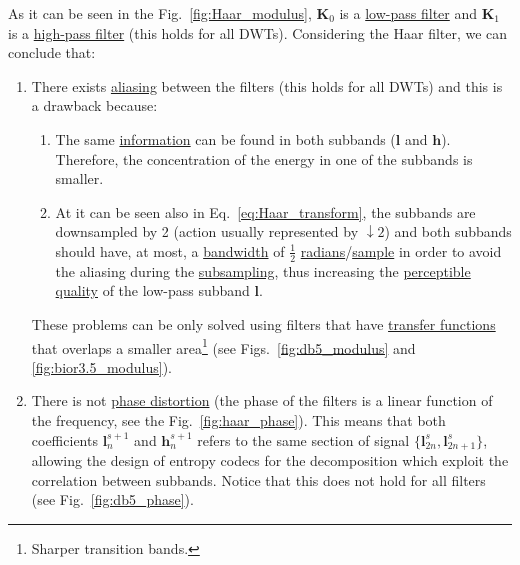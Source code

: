 As it can be seen in the Fig.~\ref{fig:Haar_modulus}, ${\mathbf K}_0$ is a
\href{https://en.wikipedia.org/wiki/Low-pass_filter}{low-pass filter}
and ${\mathbf K}_1$ is a
\href{https://en.wikipedia.org/wiki/High-pass_filter}{high-pass
  filter} (this holds for all DWTs). Considering the Haar filter, we
can conclude that:
\begin{enumerate}
\item There exists
  \href{https://en.wikipedia.org/wiki/Aliasing}{aliasing} between the
  filters (this holds for all DWTs) and this is a drawback because:
  \begin{enumerate}
  \item The same
    \href{https://en.wikipedia.org/wiki/Information}{information} can
    be found in both subbands (${\mathbf l}$ and ${\mathbf
      h}$). Therefore, the concentration of the energy in one of the
    subbands is smaller.
  \item At it can be seen also in Eq.~\ref{eq:Haar_transform}, the
    subbands are downsampled by 2 (action usually represented by
    $\downarrow 2$) and both subbands should have, at most, a
    \href{https://en.wikipedia.org/wiki/Bandwidth_(signal_processing)}{bandwidth}
    of $\frac{1}{2}$
    \href{https://en.wikipedia.org/wiki/Radian}{radians}/\href{https://en.wikipedia.org/wiki/Sampling_(signal_processing)}{sample}
    in order to avoid the aliasing during the
    \href{https://en.wikipedia.org/wiki/Downsampling_(signal_processing)}{subsampling},
    thus increasing the
    \href{https://en.wikipedia.org/wiki/Perception}{perceptible}
    \href{https://en.wikipedia.org/wiki/Signal-to-noise_ratio}{quality}
    of the low-pass subband ${\mathbf l}$.
  \end{enumerate}
  These problems can be only solved using filters that have
  \href{https://en.wikipedia.org/wiki/Transfer_function}{transfer
    functions} that overlaps a smaller area\footnote{Sharper
  transition bands.} (see Figs.~\ref{fig:db5_modulus} and
  \ref{fig:bior3.5_modulus}).
\item There is not
  \href{https://en.wikipedia.org/wiki/Linear_phase}{phase distortion}
  (the phase of the filters is a linear function of the frequency, see
  the Fig.~\ref{fig:haar_phase}). This means that both coefficients
  ${\mathbf l}^{s+1}_n$ and ${\mathbf h}^{s+1}_n$ refers to the same section of signal
  $\{{\mathbf l}^s_{2n}, {\mathbf l}^s_{2n+1}\}$, allowing the design of entropy codecs
  for the decomposition which exploit the correlation between
  subbands. Notice that this does not hold for all filters (see
  Fig.~\ref{fig:db5_phase}).
\end{enumerate}

